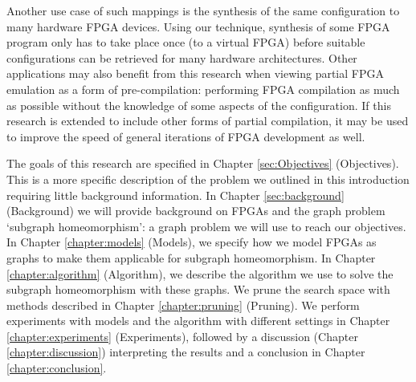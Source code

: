 Another use case of such mappings is the synthesis of the same configuration to many hardware FPGA devices. Using our technique, synthesis of some FPGA program only has to take place once (to a virtual FPGA) before suitable configurations can be retrieved for many hardware architectures. Other applications may also benefit from this research when viewing partial FPGA emulation as a form of pre-compilation: performing FPGA compilation as much as possible without the knowledge of some aspects of the configuration. If this research is extended to include other forms of partial compilation, it may be used to improve the speed of general iterations of FPGA development as well.

The goals of this research are specified in Chapter \ref{sec:Objectives} (Objectives). This is a more specific description of the problem we outlined in this introduction requiring little background information. In Chapter \ref{sec:background} (Background) we will provide background on FPGAs and the graph problem `subgraph homeomorphism': a graph problem we will use to reach our objectives. In Chapter \ref{chapter:models} (Models), we specify how we model FPGAs as graphs to make them applicable for subgraph homeomorphism. In Chapter \ref{chapter:algorithm} (Algorithm), we describe the algorithm we use to solve the subgraph homeomorphism with these graphs. We prune the search space with methods described in Chapter \ref{chapter:pruning} (Pruning). We perform experiments with models and the algorithm with different settings in Chapter \ref{chapter:experiments} (Experiments), followed by a discussion (Chapter \ref{chapter:discussion}) interpreting the results and a conclusion in Chapter \ref{chapter:conclusion}.